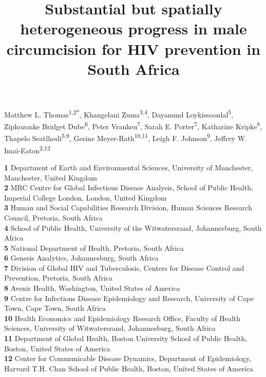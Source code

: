 \documentclass{article}
\title{Substantial but spatially heterogeneous progress in male circumcision for HIV prevention in South Africa}
\author{}
\date{}
\begin{document}

\maketitle

\vspace{-1cm}

Matthew L. Thomas\textsuperscript{1,2*},
Khangelani Zuma\textsuperscript{3,4},
Dayanund Loykissoonlal\textsuperscript{5},
Ziphozonke Bridget Dube\textsuperscript{6},
Peter Vranken\textsuperscript{7},
Sarah E. Porter\textsuperscript{7},
Katharine Kripke\textsuperscript{8},
Thapelo Seatlhodi\textsuperscript{5,9},
Gesine Meyer-Rath\textsuperscript{10,11},
Leigh F. Johnson\textsuperscript{9},
Jeffrey W. Imai-Eaton\textsuperscript{2,12} \\
\smallskip
  
\textbf{1} Department of Earth and Environmental Sciences, University of Manchester, Manchester, United Kingdom\\
\textbf{2} MRC Centre for Global Infectious Disease Analysis, School of Public Health, Imperial College London, London, United Kingdom\\
\textbf{3} Human and Social Capabilities Research Division, Human Sciences Research Council,  Pretoria, South Africa\\
\textbf{4} School of Public Health, University of the Witwatersrand, Johannesburg, South Africa\\
\textbf{5} National Department of Health, Pretoria, South Africa\\
\textbf{6} Genesis Analytics, Johannesburg, South Africa\\
\textbf{7} Division of Global HIV and Tuberculosis, Centers for Disease Control and Prevention, Pretoria, South Africa\\
\textbf{8} Avenir Health, Washington, United States of America\\
\textbf{9} Centre for Infectious Disease Epidemiology and Research, University of Cape Town, Cape Town, South Africa \\
\textbf{10} Health Economics and Epidemiology Research Office, Faculty of Health Sciences, University of Witwatersrand, Johannesburg, South Africa\\
\textbf{11} Department of Global Health, Boston University School of Public Health, Boston, United States of America\\
\textbf{12} Center for Communicable Disease Dynamics, Department of Epidemiology, Harvard T.H. Chan School of Public Health, Boston, United States of America\\
\smallskip
\end{document}
